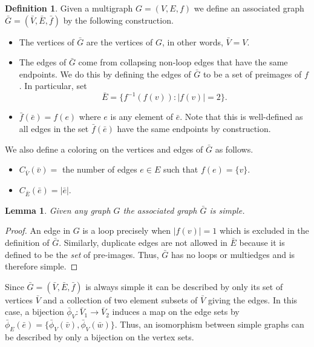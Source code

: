 \documentclass[amsmath,secnumarabic,floatfix,amssymb,nofootinbib,nobibnotes,letterpaper,11pt,tightenlines,showkeys]{revtex4}
\newtheorem{lemma}[theorem]{Lemma}
\theoremstyle{definition}
\newtheorem{definition}[theorem]{Definition}
\newcommand{\abs}[1]{\lvert#1\rvert}
\let\mgp=\marginpar \marginparwidth18mm \marginparsep1mm
\def\marginpar#1{\mgp{\raggedright\tiny #1}}
\let\lbl=\label
\def\label#1{\lbl{#1}\ifinner\else\marginpar{\ref{#1} #1}\ignorespaces\fi}
\begin{document}
\begin{definition}{\label{gbar}}
	Given a multigraph $G=(V,E,f)$ we define an associated graph $\bar{G} = (\bar{V}, \bar{E}, \bar{f})$ by the following construction. 

	\begin{itemize}
		\item The vertices of $\bar{G}$ are the vertices of $G$, in other words, $\bar{V} = V$.
		\item The edges of $\bar{G}$ come from collapsing non-loop edges that have the same endpoints. We do this by defining the edges of $\bar{G}$ to be a set of preimages of $f$. In particular, set $$\bar{E} =  \{f^{-1}(f(v)) : \abs{f(v)} = 2\}.$$
		\item $\bar{f}(\bar{e}) = f(e)$ where $e$ is any element of $\bar{e}$. Note that this is well-defined as all edges in the set $\bar{f}(\bar{e})$ have the same endpoints by construction.
		
	\end{itemize}

	We also define a coloring on the vertices and edges of $\bar{G}$ as follows.
	
	\begin{itemize}
		\item $C_{\bar{V}}(\bar{v}) = $ the number of edges $e \in E$ such that $f(e) = \{v\}$.
		\item $C_{\bar{E}}(\bar{e}) = \abs{\bar{e}}$.  %
	\end{itemize}

\end{definition}

\begin{lemma}
	Given any graph $G$ the associated graph $\bar{G}$ is simple.
\end{lemma}

\begin{proof}
	An edge in $G$ is a loop precisely when $\abs{f(v)} = 1$ which is excluded in the definition of $\bar{G}$. Similarly, duplicate edges are not allowed in $\bar{E}$ because it is defined to be the \emph{set} of pre-images. Thus, $\bar{G}$ has no loops or multiedges and is therefore simple.
\end{proof}

Since $\bar{G} = (\bar{V}, \bar{E}, \bar{f})$ is always simple it can be described by only its set of vertices $\bar{V}$ and a collection of two element subsets of $\bar{V}$ giving the edges. In this case, a bijection $\bar{\phi}_V: \bar{V}_1 \rightarrow \bar{V}_2$ induces a map on the edge sets by $\bar{\phi}_E(\bar{e}) = \{\bar{\phi}_V(\bar{v}),\bar{\phi}_V(\bar{w})\}$. Thus, an isomorphism between simple graphs can be described by only a bijection on the vertex sets.
\end{document}
